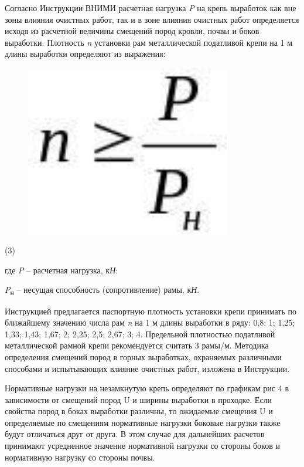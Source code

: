 Согласно Инструкции ВНИМИ расчетная нагрузка \emph{P} на крепь выработок
как вне зоны влияния очистных работ, так и в зоне влияния очистных работ
определяется исходя из расчетной величины смещений пород кровли, почвы и
боков выработки. Плотность \emph{n} установки рам металлической
податливой крепи на 1 м длины выработки определяют из выражения:

\begin{figure}[H]
	\centering
	\includegraphics[width=0.8\textwidth]{assets/1128}
	\caption*{}
\end{figure} (3)

где \emph{P} -- расчетная нагрузка, к\emph{Н}:

\emph{P}\textsubscript{н} -- несущая способность (сопротивление) рамы,
к\emph{Н}.

Инструкцией предлагается паспортную плотность установки крепи принимать
по ближайшему значению числа рам \emph{n} на 1 м длины выработки в ряду:
0,8; 1; 1,25; 1,33; 1,43; 1,67; 2; 2,25; 2,5; 2,67; 3; 4. Предельной
плотностью податливой металлической рамной крепи рекомендуется считать 3
рамы/м. Методика определения смещений пород в горных выработках,
охраняемых различными способами и испытывающих влияние очистных работ,
изложена в Инструкции.

Нормативные нагрузки на незамкнутую крепь определяют по графикам рис 4 в
зависимости от смещений пород U и ширины выработки в проходке. Если
свойства пород в боках выработки различны, то ожидаемые смещения U и
определяемые по смещениям нормативные нагрузки боковые нагрузки также
будут отличаться друг от друга. В этом случае для дальнейших расчетов
принимают усредненное значение нормативной нагрузки со стороны боков и
нормативную нагрузку со стороны почвы.


